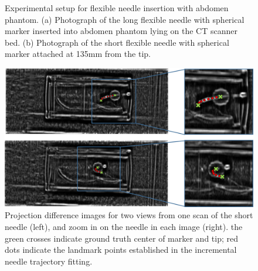 

\begin{figure}[t]
  \centering
  \hfill
  \caption{\small{Experimental setup for flexible needle insertion with abdomen phantom. (a) Photograph of the long flexible needle with spherical marker inserted into abdomen phantom lying on the CT scanner bed. (b) Photograph of the short flexible needle with spherical marker attached at 135mm from the tip.}}
    \label{fig:figures/fractional}
\end{figure}







\begin{figure}[b]
\centering
\includegraphics[width=\textwidth]{projection_diff_images.png}
\caption{\small{Projection difference images for two views from one scan of the short needle (left), and zoom in on the needle in each image (right). the green crosses indicate ground truth center of marker and tip; red dots indicate the landmark points established in the incremental needle trajectory fitting.}}
\label{proj_diff_fig}
\end{figure}

